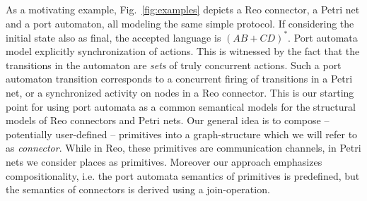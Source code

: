 \documentclass[copyright,creativecommons]{eptcs}
\begin{document}
As a motivating example, Fig.~\ref{fig:examples} depicts a Reo connector,
a Petri net and a port automaton, all modeling the same simple protocol.
If considering the initial state also as final, the accepted language
is $(AB+CD)^{*}$. Port automata model explicitly synchronization of actions.
This is witnessed by the fact that the transitions in the automaton are 
\emph{sets} of truly concurrent actions. Such a port automaton transition
corresponds to a concurrent firing of transitions in a Petri net, or a synchronized activity
on nodes in a Reo connector. This is our starting point for
using port automata as a common semantical models for the structural
models of Reo connectors and Petri nets. Our general idea is to compose 
-- potentially user-defined -- primitives into a graph-structure which we will
refer to as \emph{connector}. While in Reo, these primitives are communication channels,
in Petri nets we consider places as primitives.
Moreover our approach emphasizes compositionality, i.e.
the port automata semantics of primitives is predefined, but the semantics 
of connectors is derived using a join-operation.
\end{document}
